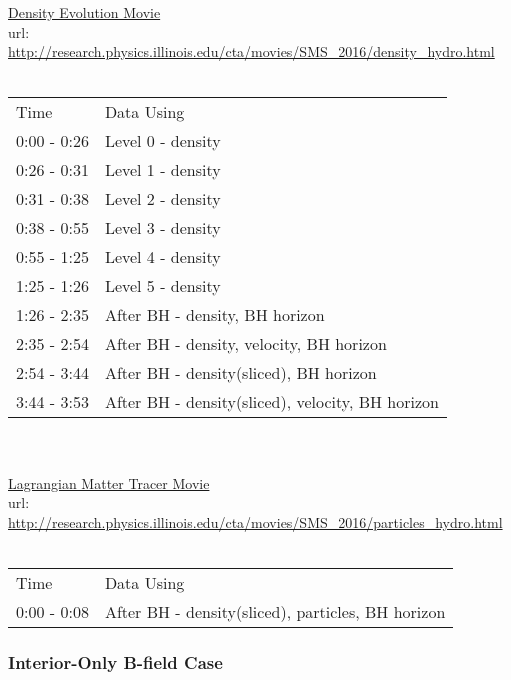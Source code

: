\documentclass{article}
\begin{document}
\underline{Density Evolution Movie} \\
url: \url{http://research.physics.illinois.edu/cta/movies/SMS_2016/density_hydro.html} \\
\\
\begin{tabular}{l l}
Time		& Data Using \\
0:00 - 0:26	& Level 0 - density \\
0:26 - 0:31	& Level 1 - density \\
0:31 - 0:38	& Level 2 - density \\
0:38 - 0:55	& Level 3 - density \\
0:55 - 1:25	& Level 4 - density \\
1:25 - 1:26	& Level 5 - density \\
1:26 - 2:35	& After BH - density, BH horizon \\
2:35 - 2:54	& After BH - density, velocity, BH horizon \\
2:54 - 3:44	& After BH - density(sliced), BH horizon \\
3:44 - 3:53	& After BH - density(sliced), velocity, BH horizon \\
\end{tabular}
\\
\\
\underline{Lagrangian Matter Tracer Movie} \\
url: \url{http://research.physics.illinois.edu/cta/movies/SMS_2016/particles_hydro.html} \\
\\
\begin{tabular}{l l}
Time		& Data Using \\
0:00 - 0:08	& After BH - density(sliced), particles, BH horizon \\
\end{tabular}

\subsubsection{Interior-Only B-field Case}
\end{document}
